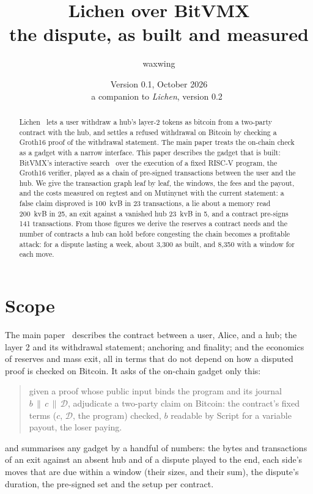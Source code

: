 \documentclass[11pt]{article}
\title{\textbf{Lichen over BitVMX}\\the dispute, as built and measured}
\author{waxwing}
\date{Version 0.1, October 2026\\[2pt]\small a companion to \emph{Lichen}, version 0.2~\cite{lichen}}
\begin{document}
\maketitle

\begin{abstract}
Lichen~\cite{lichen} lets a user withdraw a hub's layer-2 tokens as
bitcoin from a two-party contract with the hub, and settles a refused
withdrawal on Bitcoin by checking a Groth16 proof of the withdrawal
statement. The main paper treats the on-chain check as a gadget with a
narrow interface. This paper describes the gadget that is built: BitVMX's
interactive search~\cite{bitvmx} over the execution of a fixed RISC-V
program, the Groth16 verifier, played as a chain of pre-signed
transactions between the user and the hub. We give the transaction graph
leaf by leaf, the windows, the fees and the payout, and the costs
measured on regtest and on Mutinynet with the current statement: a false
claim disproved is 100~kvB in 23 transactions, a lie about a memory read
200~kvB in 25, an exit against a vanished hub 23~kvB in 5, and a
contract pre-signs 141 transactions. From those figures we derive the
reserves a contract needs and the number of contracts a hub can hold
before congesting the chain becomes a profitable attack: for a dispute
lasting a week, about 3,300 as built, and 8,350 with a window for each
move.
\end{abstract}

\tableofcontents

\section{Scope}
\label{sec:scope}

The main paper~\cite{lichen} describes the contract between a user,
Alice, and a hub; the layer 2 and its withdrawal statement; anchoring and
finality; and the economics of reserves and mass exit, all in terms that
do not depend on how a disputed proof is checked on Bitcoin. It asks of
the on-chain gadget only this:
\begin{quote}
given a proof whose public input binds the program and its journal
$b \,\|\, c \,\|\, \mathcal{D}$, adjudicate a two-party claim on Bitcoin: the
contract's fixed terms ($c$, $\mathcal{D}$, the program) checked, $b$ readable by
Script for a variable payout, the loser paying.
\end{quote}
and summarises any gadget by a handful of numbers: the bytes and
transactions of an exit against an absent hub and of a dispute played
to the end, each side's moves that are due within a window (their sizes,
and their sum), the dispute's duration, the pre-signed set and the setup
per contract.
\end{document}
